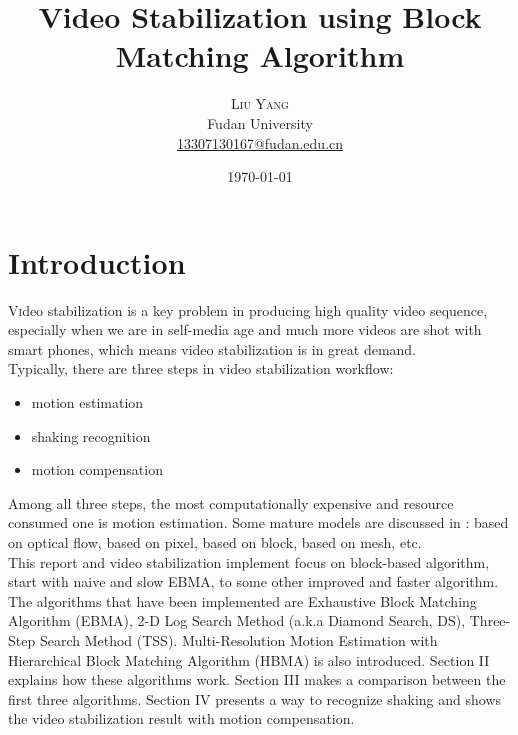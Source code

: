\documentclass[a4paper, twocolumn]{article}
\title{Video Stabilization using Block Matching Algorithm} %
\author{%
	\textsc{Liu Yang} \\[1ex] %
	\normalsize Fudan University \\ %
	\normalsize \href{mailto:13307130167@fudan.edu.cn}{13307130167@fudan.edu.cn} %
}
\date{\today} %
\begin{document}
	
	\maketitle
	
	\section{Introduction}
	
	\lettrine[nindent=0em,lines=3]{V} ideo stabilization is a key problem in producing high quality video sequence, especially when we are in self-media age and much more videos are shot with smart phones, which means video stabilization is in great demand. \\
	Typically, there are three steps in video stabilization workflow: 
	
	\begin{itemize}
		\item motion estimation
		\item shaking recognition
		\item motion compensation
	\end{itemize}
	\noindent
	Among all three steps, the most computationally expensive and resource consumed one is motion estimation. Some mature models are discussed in \cite{vpc}: based on optical flow, based on pixel, based on block, based on mesh, etc. \\
	This report and video stabilization implement focus on block-based algorithm, start with naive and slow EBMA, to some other improved and faster algorithm. The algorithms that have been implemented are Exhaustive Block Matching Algorithm (EBMA), 2-D Log Search Method (a.k.a Diamond Search, DS), Three-Step Search Method (TSS). Multi-Resolution Motion Estimation with Hierarchical Block Matching Algorithm (HBMA) is also introduced. Section II explains how these algorithms work. Section III makes a comparison between the first three algorithms. Section IV presents a way to recognize shaking and shows the video stabilization result with motion compensation.
	
	
\end{document}
